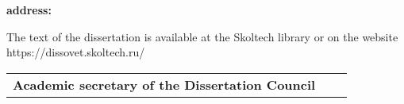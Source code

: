 \noindent\textbf{address:} 

\vspace{0.0004\paperheight plus1fill}
\noindent The text of the dissertation is available at the Skoltech library or on the website https://dissovet.skoltech.ru/

\vspace{0.0004\paperheight plus1fill}

\vspace{0.008\paperheight plus1fill}
\noindent%
\begin{tabularx}{\textwidth}{@{}%
		>{\raggedright\arraybackslash}b{14em}@{}
		>{\centering\arraybackslash}X
		r
		@{}}
	\textbf{Academic secretary of the Dissertation Council}\par
	&
	&
\end{tabularx}
